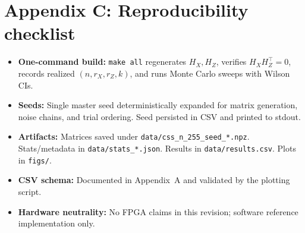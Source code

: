 \section*{Appendix C: Reproducibility checklist}

\begin{itemize}
  \item \textbf{One-command build:} \texttt{make all} regenerates $H_X,H_Z$, verifies $H_X H_Z^\top\!=\!0$, records realized $(n,r_X,r_Z,k)$, and runs Monte Carlo sweeps with Wilson CIs.
  \item \textbf{Seeds:} Single master seed deterministically expanded for matrix generation, noise chains, and trial ordering. Seed persisted in CSV and printed to stdout.
  \item \textbf{Artifacts:} Matrices saved under \texttt{data/css\_n\_255\_seed\_*.npz}. Stats/metadata in \texttt{data/stats\_*.json}. Results in \texttt{data/results.csv}. Plots in \texttt{figs/}.
  \item \textbf{CSV schema:} Documented in Appendix~A and validated by the plotting script.
  \item \textbf{Hardware neutrality:} No FPGA claims in this revision; software reference implementation only.
\end{itemize}

